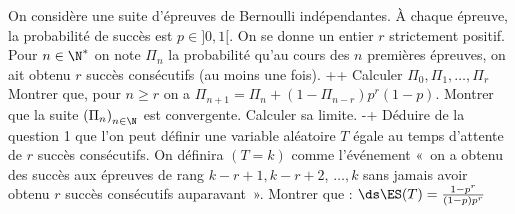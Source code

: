\begin{exercise}
On considère une suite d'épreuves de Bernoulli indépendantes. À chaque épreuve, la probabilité de succès est $p \in] 0,1[$. On se donne un entier $r$ strictement positif. Pour $n \in \N^{*}$ on note $\Pi_{n}$ la probabilité qu'au cours des $n$ premières épreuves, on ait obtenu $r$ succès consécutifs (au moins une fois).
\question+\question+ Calculer $\Pi_{0}, \Pi_{1}, \ldots, \Pi_{r}$
\question Montrer que, pour $n \geqslant r$ on a $\Pi_{n+1}=\Pi_{n}+\left(1-\Pi_{n-r}\right) p^{r}(1-p)$.
\question Montrer que la suite $\left(\Pi_{n}\right)_{n \in \N}$ est convergente. Calculer sa limite.
\question-\question+ Déduire de la question 1 que l'on peut définir une variable aléatoire $T$ égale au temps d'attente de $r$ succès consécutifs. On définira $(T=k)$ comme l'événement  «~on a obtenu des succès aux épreuves de rang $k-r+1, k-r+2$, $\ldots, k$ sans jamais avoir obtenu $r$ succès consécutifs auparavant~».
\question Montrer que :
$\ds\ES(T)=\frac{1-p^{r}}{(1-p) p^{r}}$
\endquestions 
\end{exercise}

